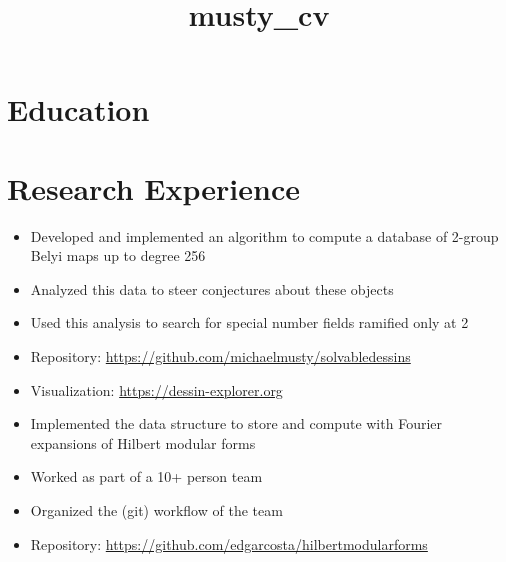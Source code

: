 \documentclass[a4paper]{adcv}
\title{musty_cv}
\begin{document}
\section{Education}{
  \begin{adcvtabletwo}
    \adcvrowskip
    \adcvrowskip
  \end{adcvtabletwo}
}

\section{Research Experience}{
  \begin{adcvtabletwo}
      \vspace{-10pt}
      \begin{itemize}
        \item
          Developed and implemented an algorithm to compute
          a database of 2-group Belyi maps up to degree 256
        \item
          Analyzed this data to steer conjectures about these objects
        \item
          Used this analysis to search for special number fields
          ramified only at 2
        \item
          Repository: \url{https://github.com/michaelmusty/solvabledessins}
        \item
          Visualization: \url{https://dessin-explorer.org}
      \end{itemize}
    \adcvrowskip
      \vspace{-10pt}
      \begin{itemize}
        \item
          Implemented the data structure to store
          and compute with Fourier expansions of Hilbert modular forms
        \item
          Worked as part of a 10+ person team
        \item
          Organized the (git) workflow of the team
        \item
          Repository: \url{https://github.com/edgarcosta/hilbertmodularforms}

\end{itemize}
\end{adcvtabletwo}}
\end{document}

